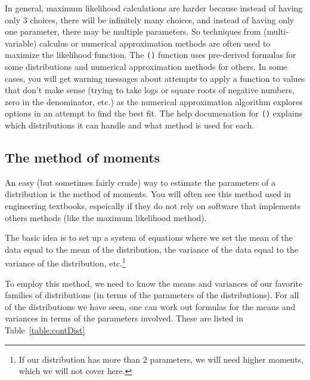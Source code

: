 \documentclass[twoside]{book}\usepackage[]{graphicx}\usepackage[]{xcolor}
\newcommand{\Rindex}[1]{\index{\texttt{#1}}}
\newcommand{\function}[1]{{\color{purple!75!blue}\texttt{\StrSubstitute{#1}{()}{}()}}\Rindex{#1}}
\begin{document}
In general, maximum likelihood calculations are harder because instead of having
only 3 choices, there will be infinitely many choices, and instead of having only
one parameter, there may be multiple parameters.  So techniques from (multi-variable) 
calculus or numerical approximation methods are often used to maximize the likelihood function.
The \function{fitdistr()} function uses pre-derived formulas for some distributions
and numerical approximation methods for others.  In some cases, you will get warning
messages about attempts to apply a function to values that don't make sense (trying to
take logs or square roots of negative numbers, zero in the denominator, etc.) as the 
numerical approximation algorithm explores options in an attempt to find the best fit.
The help documenation for \function{fitdistr()} explains which distributions it can 
handle and what method is used for each.

\subsection{The method of moments}
An easy (but sometimes fairly crude) way to estimate the parameters of a distribution
is the method of moments.  You will often see this method used in engineering textbooks,
espeically if they do not rely on software that implements others methods (like the 
maximum likelihood method).

The basic idea is to set up a system of  equations where we set the mean of the data equal to the mean of the distribution, the variance of the data equal to the variance of the distribution, etc.\footnote{If our distribution has more than 2 parameters, we will need higher moments, which we will not cover here.}  

To employ this method, we need to know the means and variances of our favorite families of distributions (in terms of the parameters of the distributions).  For all of the distributions we have seen, one can work out formulas for the means and variances in terms of the parameters involved.  These are listed in Table~\ref{table:contDist}
\end{document}
